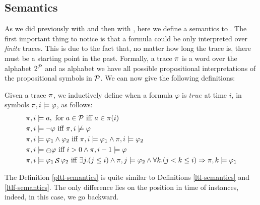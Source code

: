 \subsection{Semantics}
As we did previously with \LTL and then with \LTLf, here we define a semantics to \PLTL. The first important thing to notice is that a \PLTL formula could be only interpreted over \emph{finite} traces. This is due to the fact that, no matter how long the trace is, there must be a starting point in the past. Formally, a trace $\trace$ is a word over the alphabet $2^\P$ and as alphabet we have all possible propositional interpretations of the propositional symbols in $\P$. We can now give the following definitions:
\begin{definition}\label{pltl-semantics}
Given a trace $\trace$, we inductively define when a \PLTL formula $\varphi$ is $true$ at time $i$, in symbols $\trace, i \models \varphi$, as follows:
\begin{align*}
\trace, i &\models a, \tm{for} a\in\P \tiff a \in \trace(i)\\
\trace, i &\models \lnot \varphi \tiff \trace, i \not\models \varphi\\
\trace, i &\models \varphi_1 \lAND \varphi_2 \tiff \trace, i \models \varphi_1 \lAND \trace, i \models \varphi_2\\
\trace, i &\models \Yesterday\varphi \tiff i > 0 \lAND \trace,i-1 \models \varphi\\
\trace, i &\models \varphi_1 \Since \varphi_2 \tiff \exists j. (j\le i) \lAND \trace,j \models \varphi_2 \lAND\forall k. (j < k \le i) \Rightarrow \trace, k \models \varphi_1\\
\end{align*}
\end{definition}
The Definition \ref{pltl-semantics} is quite similar to Definitions \ref{ltl-semantics} and \ref{ltlf-semantics}. The only difference lies on the position in time of instances, indeed, in this case, we go backward.
